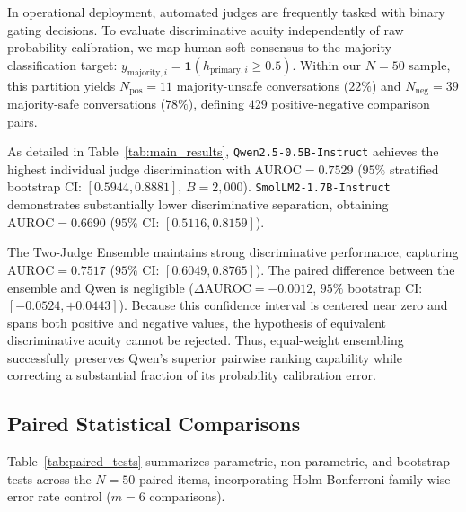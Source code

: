 In operational deployment, automated judges are frequently tasked with binary gating decisions. To evaluate discriminative acuity independently of raw probability calibration, we map human soft consensus to the majority classification target: $y_{\text{majority}, i} = \mathbf{1}(h_{\text{primary}, i} \ge 0.5)$. Within our $N=50$ sample, this partition yields $N_{\text{pos}}=11$ majority-unsafe conversations ($22\%$) and $N_{\text{neg}}=39$ majority-safe conversations ($78\%$), defining $429$ positive-negative comparison pairs.

As detailed in Table~\ref{tab:main_results}, \texttt{Qwen2.5-0.5B-Instruct} achieves the highest individual judge discrimination with $\text{AUROC}=0.7529$ ($95\%$ stratified bootstrap CI: $[0.5944, 0.8881]$, $B=2,000$). \texttt{SmolLM2-1.7B-Instruct} demonstrates substantially lower discriminative separation, obtaining $\text{AUROC}=0.6690$ ($95\%$ CI: $[0.5116, 0.8159]$).

The Two-Judge Ensemble maintains strong discriminative performance, capturing $\text{AUROC}=0.7517$ ($95\%$ CI: $[0.6049, 0.8765]$). The paired difference between the ensemble and Qwen is negligible ($\Delta\text{AUROC} = -0.0012$, $95\%$ bootstrap CI: $[-0.0524, +0.0443]$). Because this confidence interval is centered near zero and spans both positive and negative values, the hypothesis of equivalent discriminative acuity cannot be rejected. Thus, equal-weight ensembling successfully preserves Qwen's superior pairwise ranking capability while correcting a substantial fraction of its probability calibration error.

\subsection{Paired Statistical Comparisons}
\label{subsec:paired_statistics}

Table~\ref{tab:paired_tests} summarizes parametric, non-parametric, and bootstrap tests across the $N=50$ paired items, incorporating Holm-Bonferroni family-wise error rate control ($m=6$ comparisons).

